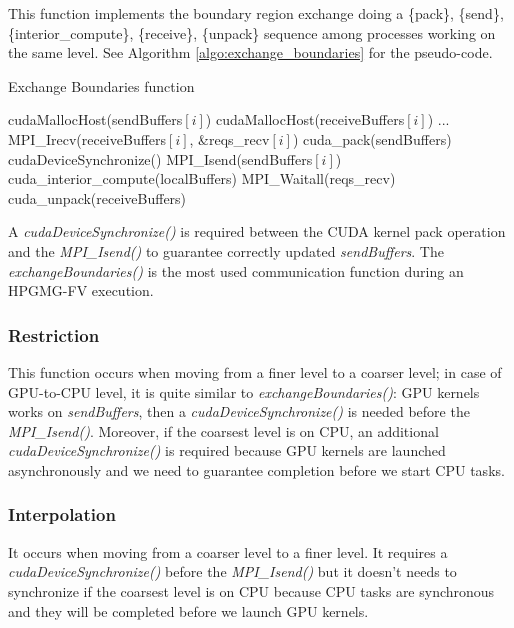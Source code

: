 \documentclass[conference]{IEEEtran}
\begin{document}
This function implements the boundary region exchange doing a \{pack\}, \{send\}, \{interior\_compute\}, \{receive\}, \{unpack\} sequence among processes working on the same level. See Algorithm \ref{algo:exchange_boundaries} for the pseudo-code.
\\
\begin{algorithm}
\small
\caption{Exchange Boundaries function}
\label{algo:exchange_boundaries}
\begin{algorithmic}[1]
\State cudaMallocHost(sendBuffers$[i]$)
\State cudaMallocHost(receiveBuffers$[i]$)
\EndFor
\State ...
 \label{alg:b}
		\State MPI\_Irecv(receiveBuffers$[i]$, \&reqs\_recv$[i]$)    
	\EndFor
	\State cuda\_pack(sendBuffers)
	\State cudaDeviceSynchronize()
		\State MPI\_Isend(sendBuffers$[i]$)    
	\EndFor
	\State cuda\_interior\_compute(localBuffers)
	\State MPI\_Waitall(reqs\_recv)
	\State cuda\_unpack(receiveBuffers)
\EndFunction
\end{algorithmic}
\end{algorithm}

A \textit{cudaDeviceSynchronize()} is required between the CUDA kernel pack operation and the \textit{MPI\_Isend()} to guarantee correctly updated \textit{sendBuffers}.
The \textit{exchangeBoundaries()} is the most used communication function during an HPGMG-FV execution.

\subsubsection{Restriction}

This function occurs when moving from a finer level to a coarser level; in case of GPU-to-CPU level, it is quite similar to \textit{exchangeBoundaries()}: GPU kernels works on \textit{sendBuffers}, then a \textit{cudaDeviceSynchronize()} is needed before the \textit{MPI\_Isend()}. Moreover, if the coarsest level is on CPU, an additional \textit{cudaDeviceSynchronize()} is required because GPU kernels are launched asynchronously and we need to guarantee completion before we start CPU tasks.

\subsubsection{Interpolation}

It occurs when moving from a coarser level to a finer level. It requires a \textit{cudaDeviceSynchronize()} before the \textit{MPI\_Isend()} but it doesn't needs to synchronize if the coarsest level is on CPU because CPU tasks are synchronous and they will be completed before we launch GPU kernels.\\
\end{document}
